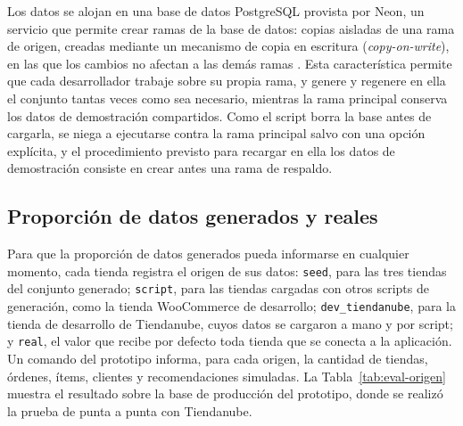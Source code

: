 Los datos se alojan en una base de datos PostgreSQL provista por Neon, un servicio que permite crear ramas de la base de datos: copias aisladas de una rama de origen, creadas mediante un mecanismo de copia en escritura (\emph{copy-on-write}), en las que los cambios no afectan a las demás ramas \parencite{NeonBranching2026}. Esta característica permite que cada desarrollador trabaje sobre su propia rama, y genere y regenere en ella el conjunto tantas veces como sea necesario, mientras la rama principal conserva los datos de demostración compartidos. Como el script borra la base antes de cargarla, se niega a ejecutarse contra la rama principal salvo con una opción explícita, y el procedimiento previsto para recargar en ella los datos de demostración consiste en crear antes una rama de respaldo.

\subsection{Proporción de datos generados y reales}
\label{sec:eval-origen}

Para que la proporción de datos generados pueda informarse en cualquier momento, cada tienda registra el origen de sus datos: \texttt{seed}, para las tres tiendas del conjunto generado; \texttt{script}, para las tiendas cargadas con otros scripts de generación, como la tienda WooCommerce de desarrollo; \texttt{dev\_tiendanube}, para la tienda de desarrollo de Tiendanube, cuyos datos se cargaron a mano y por script; y \texttt{real}, el valor que recibe por defecto toda tienda que se conecta a la aplicación. Un comando del prototipo informa, para cada origen, la cantidad de tiendas, órdenes, ítems, clientes y recomendaciones simuladas. La Tabla~\ref{tab:eval-origen} muestra el resultado sobre la base de producción del prototipo, donde se realizó la prueba de punta a punta con Tiendanube.

